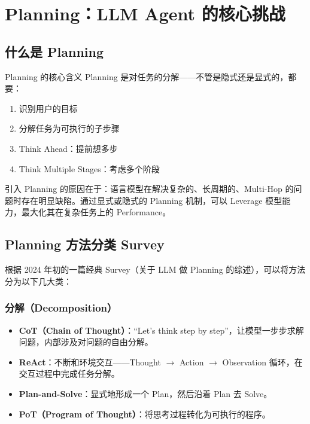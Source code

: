 \section{Planning：LLM Agent 的核心挑战}

\subsection{什么是 Planning}

\begin{importantbox}{Planning 的核心含义}
Planning 是对任务的分解——不管是隐式还是显式的，都要：
\begin{enumerate}
    \item 识别用户的目标
    \item 分解任务为可执行的子步骤
    \item Think Ahead：提前想多步
    \item Think Multiple Stages：考虑多个阶段
\end{enumerate}
\end{importantbox}

引入 Planning 的原因在于：语言模型在解决复杂的、长周期的、Multi-Hop 的问题时存在明显缺陷。通过显式或隐式的 Planning 机制，可以 Leverage 模型能力，最大化其在复杂任务上的 Performance。

\subsection{Planning 方法分类 Survey}

根据 2024 年初的一篇经典 Survey（关于 LLM 做 Planning 的综述），可以将方法分为以下几大类：

\subsubsection{分解（Decomposition）}

\begin{itemize}
    \item \textbf{CoT（Chain of Thought）}：``Let's think step by step''，让模型一步步求解问题，内部涉及对问题的自由分解。
    \item \textbf{ReAct}：不断和环境交互——Thought $\rightarrow$ Action $\rightarrow$ Observation 循环，在交互过程中完成任务分解。
    \item \textbf{Plan-and-Solve}：显式地形成一个 Plan，然后沿着 Plan 去 Solve。
    \item \textbf{PoT（Program of Thought）}：将思考过程转化为可执行的程序。
\end{itemize}

